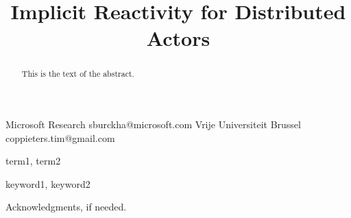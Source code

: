 \documentclass[preprint,numbers,10pt]{sigplanconf}
\begin{document}
\setlength{\pdfpageheight}{\paperheight}
\setlength{\pdfpagewidth}{\paperwidth}




\title{Implicit Reactivity for Distributed Actors}
\subtitle{}

           {Microsoft Research}
           {sburckha@microsoft.com}
           {Vrije Universiteit Brussel}
           {coppieters.tim@gmail.com}

\maketitle

\begin{abstract}
This is the text of the abstract.
\end{abstract}


\terms
term1, term2

\keywords
keyword1, keyword2







 

 

\acks

Acknowledgments, if needed.






\end{document}
